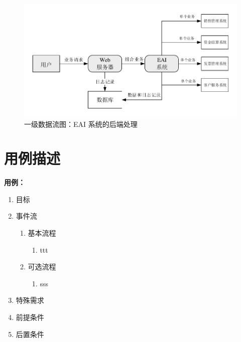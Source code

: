 \documentclass[cs4size,a4paper,nofonts]{ctexart}
\begin{document}
\begin{figure}[htp]
\includegraphics[width=\textwidth,page=3]{images/dfd.pdf}
\caption{\label{dfd1.2}一级数据流图：EAI 系统的后端处理}
\end{figure}

\section{用例描述}

\newcommand{\usecasedes}[9]{\CTEXnoindent
{\bf 用例：}#1
\begin{enumerate}[label={\arabic*.}]
\item 目标

#2
\item 事件流
\begin{enumerate}[label*={\arabic*}]
\item 基本流程

#3
\begin{enumerate}[label={(\arabic*)}]
#4
\end{enumerate}
\item 可选流程

#5
\begin{enumerate}[label={(\arabic*)}]
#6
\end{enumerate}
\end{enumerate}
\item 特殊需求

#7
\item 前提条件

#8
\item 后置条件

#9
\end{enumerate}
\CTEXindent}

\usecasedes{} %
{} %
{} %
{
\item ttt
} %
{} %
{
\item sss
} %
{} %
{} %
{} %
\end{document}
